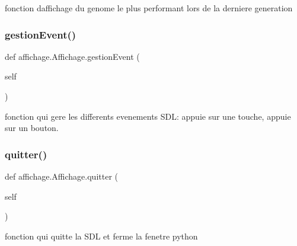 fonction d\textquotesingle{}affichage du genome le plus performant lors de la derniere generation 

\mbox{\label{classaffichage_1_1_affichage_a3ad2f7f2c22a2ff4863af09fd1b3ecd3}} 
\subsubsection{\texorpdfstring{gestion\+Event()}{gestionEvent()}}
{\footnotesize\ttfamily def affichage.\+Affichage.\+gestion\+Event (\begin{DoxyParamCaption}\item[{}]{self }\end{DoxyParamCaption})}



fonction qui gere les differents evenements S\+DL\+: appuie sur une touche, appuie sur un bouton. 

\mbox{\label{classaffichage_1_1_affichage_a72099522a0eabcb0be314bc912a2004e}} 
\subsubsection{\texorpdfstring{quitter()}{quitter()}}
{\footnotesize\ttfamily def affichage.\+Affichage.\+quitter (\begin{DoxyParamCaption}\item[{}]{self }\end{DoxyParamCaption})}



fonction qui quitte la S\+DL et ferme la fenetre python 

\mbox{\label{classaffichage_1_1_affichage_a05429a4192cb6dea63f08b9565331e89}} 
